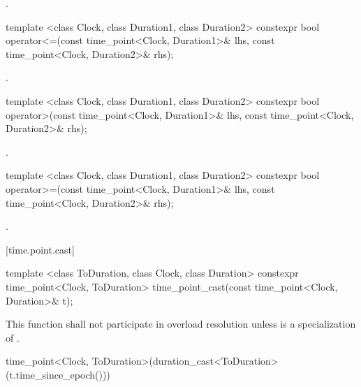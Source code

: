 \begin{itemdescr}
\pnum
\returns {}.
\end{itemdescr}

%
\begin{itemdecl}
template <class Clock, class Duration1, class Duration2>
  constexpr bool operator<=(const time_point<Clock, Duration1>& lhs,
                            const time_point<Clock, Duration2>& rhs);
\end{itemdecl}

\begin{itemdescr}
\pnum
\returns {}.
\end{itemdescr}

%
\begin{itemdecl}
template <class Clock, class Duration1, class Duration2>
  constexpr bool operator>(const time_point<Clock, Duration1>& lhs,
                           const time_point<Clock, Duration2>& rhs);
\end{itemdecl}

\begin{itemdescr}
\pnum
\returns {}.
\end{itemdescr}

%
\begin{itemdecl}
template <class Clock, class Duration1, class Duration2>
  constexpr bool operator>=(const time_point<Clock, Duration1>& lhs,
                            const time_point<Clock, Duration2>& rhs);
\end{itemdecl}

\begin{itemdescr}
\pnum
\returns {}.
\end{itemdescr}

[time.point.cast]{}

%
%
\begin{itemdecl}
template <class ToDuration, class Clock, class Duration>
  constexpr time_point<Clock, ToDuration>
  time_point_cast(const time_point<Clock, Duration>& t);
\end{itemdecl}

\begin{itemdescr}
\pnum
\remarks This function shall not participate in overload resolution
unless  is a specialization of .

\pnum
\returns
\begin{codeblock}
time_point<Clock, ToDuration>(duration_cast<ToDuration>(t.time_since_epoch()))
\end{codeblock}
\end{itemdescr}

